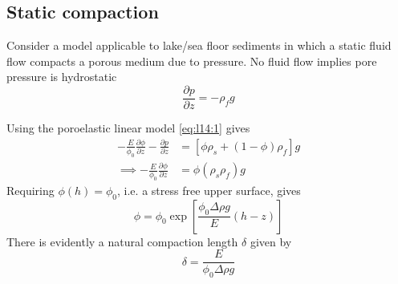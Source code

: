 \documentclass{jknotes}
\begin{document}
\subsection{Static compaction}
Consider a model applicable to lake/sea floor sediments in which a static
fluid flow compacts a porous medium due to pressure. No fluid flow implies
pore pressure is hydrostatic
\begin{equation}
	\frac{\partial p}{\partial z} = -\rho_f g
\end{equation}
\begin{center}
\end{center}
Using the poroelastic linear model \eqref{eq:l14:1} gives
\begin{align}
	-\frac{E}{\phi_0}\frac{\partial \phi}{\partial z} - \frac{\partial
	p}{\partial z} &= \left[ \phi \rho_s + (1-\phi)\rho_f\right] g \\
	\implies -\frac{E}{\phi_0}\frac{\partial \phi}{\partial z} &= \phi(\rho_s
	\rho_f) g
\end{align}
Requiring $\phi(h) = \phi_0$, i.e. a stress free upper surface, gives
\begin{equation}
	\phi = \phi_0 \exp\left[\frac{\phi_0 \Delta \rho g }{E} (h-z)\right]
\end{equation}
There is evidently a natural compaction length $\delta$ given by
\begin{equation}
	\delta = \frac{E}{\phi_0 \Delta \rho g}
\end{equation}
\end{document}
